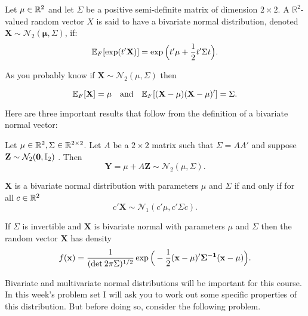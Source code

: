 \documentclass[11pt]{article} %
\begin{document}
\begin{definition}
Let $\mu \in \mathbb{R}^2$ and let $\Sigma$ be a positive semi-definite matrix of dimension $2 \times 2$. A $\mathbb{R}^2$-valued random vector $X$ is said to have a bivariate normal distribution, denoted $\mathbf{X} \sim \mathcal{N}_{2}(\mathbf{\mu}, \Sigma)$, if:
$$ \mathbb{E}_{F}[\exp(t'\mathbf{X})]= \exp\Big(t'\mu + \frac{1}{2} t'\Sigma t \Big).$$
\end{definition}

\noindent As you probably know if $\mathbf{X} \sim \mathcal{N}_2(\mu, \Sigma)$ then

$$\mathbb{E}_{F}[\mathbf{X}]= \mu \quad \text{and} \quad \mathbb{E}_{F}[ (\mathbf{X}-\mathbf{\mu})(\mathbf{X}-\mathbf{\mu})' ]=\Sigma.$$

\noindent Here are three important results that follow from the definition of a bivariate normal vector:

\begin{result}
Let $\mu \in \mathbb{R}^2, \Sigma \in \mathbb{R}^{2 \times 2}$. Let $A$ be a $2 \times 2$ matrix such that $\Sigma=AA'$ and suppose $\mathbf{Z} \sim \mathcal{N}_2(\textbf{0}, \mathbb{I}_{2})$ . Then
$$\mathbf{Y} = \mu + A \textbf{Z} \sim \mathcal{N}_2(\mu, \Sigma).$$
\end{result}


\begin{result}  $\mathbf{X}$ is a bivariate normal distribution with parameters $\mu$ and $\Sigma$ if and only if for all $c \in \mathbb{R}^2$
$$ c'\mathbf{X} \sim \mathcal{N}_1(c'\mu, c'\Sigma c).$$

\end{result}

\begin{result}
If $\Sigma$ is invertible and $\mathbf{X}$ is bivariate normal with parameters $\mu$ and $\Sigma$ then the random vector $\mathbf{X}$ has density
$$ f(\mathbf{x}) = \frac{1}{ (\text{det}\: 2\pi \Sigma)^{1/2} } \exp \Big( -\frac{1}{2} (\bf{x}-\mu)'\Sigma^{-1} (\bf{x}-\mu) \Big).$$
\end{result}

Bivariate and multivariate normal distributions will be important for this course. In this week’s problem set I will ask you to work out some specific properties of this distribution. But before doing so, consider the following problem.\\
\end{document}
